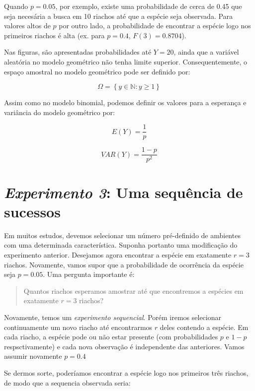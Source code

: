 \documentclass[
]{book}
\begin{document}
Quando \(p = 0.05\), por exemplo, existe uma probabilidade de cerca de 0.45 que seja necesária a busca em 10 riachos até que a espécie seja observada. Para valores altos de \(p\) por outro lado, a probabilidade de encontrar a espécie logo nos primeiros riachos é alta (ex. para \(p = 0.4\), \(F(3) = 0.8704\)).

Nas figuras, são apresentadas probabilidades até \(Y = 20\), ainda que a variável aleatória no modelo geométrico não tenha limite superior. Consequentemente, o espaço amostral no modelo geométrico pode ser definido por:

\[\Omega = \left\{ y \in \mathbb{N}: y \ge 1 \right\}\]

Assim como no modelo binomial, podemos definir os valores para a esperança e variância do modelo geométrico por:

\[E(Y) = \frac{1}{p}\]

\[VAR(Y) = \frac{1-p}{p^2}\]

\hypertarget{experimento-3-uma-sequuxeancia-de-sucessos}{%
\section{\texorpdfstring{\emph{Experimento 3}: Uma sequência de sucessos}{Experimento 3: Uma sequência de sucessos}}\label{experimento-3-uma-sequuxeancia-de-sucessos}}

Em muitos estudos, devemos selecionar um número pré-definido de ambientes com uma determinada característica. Suponha portanto uma modificação do experimento anterior. Desejamos agora encontrar a espécie em exatamente \(r = 3\) riachos. Novamente, vamos supor que a probabilidade de ocorrência da espécie seja \(p = 0.05\). Uma pergunta importante é:

\begin{quote}
Quantos riachos esperamos amostrar até que encontremos a espécies em exatamente \(r = 3\) riachos?
\end{quote}

Novamente, temos um \emph{experimento sequencial}. Porém iremos selecionar continuamente um novo riacho até encontrarmos \(r\) deles contendo a espécie. Em cada riacho, a espécie pode ou não estar presente (com probabilidades \(p\) e \(1-p\) respsctivamente) e cada nova observação é independente das anteriores. Vamos assumir novamente \(p = 0.4\)

Se dermos sorte, poderíamos encontrar a espécie logo nos primeiros três riachos, de modo que a sequencia observada seria:
\end{document}
